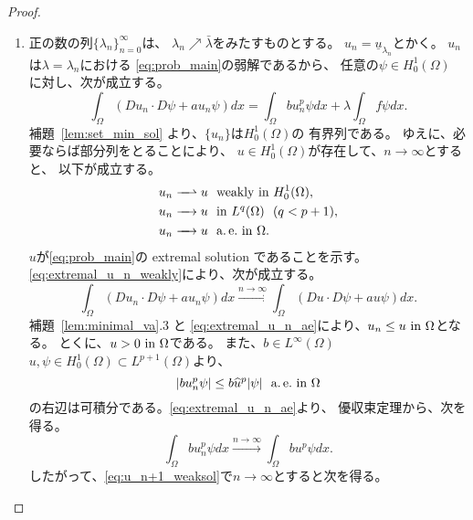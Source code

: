 \begin{proof}
 \begin{enumerate}[1.]
  \item 正の数の列$\{ \lambda_n \}_{n=0}^\infty$は、
        $\lambda_n \nearrow \bar{\lambda}$をみたすものとする。
        $u_n = \underline{u}_{\lambda_n}$とかく。
        $u_n$は$\lambda = \lambda_n$における
         \ref{eq:prob_main}の弱解であるから、
        任意の$\psi \in H_0^1(\Omega)$
        に対し、次が成立する。
        \begin{equation}
         \int_\Omega (Du_n \cdot D\psi + a u_{n} \psi) dx 
          = \int_\Omega bu_n^p \psi dx + \lambda \int_\Omega f\psi dx.
          \label{eq:u_n_weaksol}
        \end{equation}
        補題~\ref{lem:set_min_sol} より、$\{ u_n \}$は$H_0^1(\Omega)$の
         有界列である。
        ゆえに、必要ならば部分列をとることにより、
        $u \in H_0^1(\Omega)$が存在して、$n \to \infty$とすると、
        以下が成立する。
        \begin{align}
         u_n \xrightharpoonup{ \mbox{ ~ } } u & \ \ \text{weakly~} \tin
         H_0^1(\Omega), \label{eq:extremal_u_n_weakly} \\
         u_n \xrightarrow{ \mbox{ ~ } } u & \ \ \tin L^q(\Omega) \ \
          (q < p+1), \notag \\
         u_n \xrightarrow{ \mbox{ ~ } } u & \ \ \ae \tin \Omega. 
         \label{eq:extremal_u_n_ae}
        \end{align}
        $u$が\ref{eq:prob_main}の extremal solution であることを示す。
        \eqref{eq:extremal_u_n_weakly}により、次が成立する。
        \[
        \int_\Omega (Du_n \cdot D\psi + a u_n \psi) dx
        \xrightarrow{n \to \infty}
        \int_\Omega (Du \cdot D\psi + a u \psi) dx.
        \]
         補題~\ref{lem:minimal_va}.3 と
        \eqref{eq:extremal_u_n_ae}により、$u_n \leq u ~\text{in}~ \Omega$となる。
         とくに、$u > 0 ~\text{in}~ \Omega$である。
        また、$b \in L^\infty(\Omega)$
        $u, \psi \in H_0^1(\Omega) \subset L^{p+1}(\Omega)$より、
        \[
        \left\lvert bu_n^p \psi \right\rvert \leq b \widehat{u}^p
        \lvert\psi\rvert \ \ \text{a.\,e.}~
        \text{in}~ \Omega
        \]
         の右辺は可積分である。\eqref{eq:extremal_u_n_ae}より、
        優収束定理から、次を得る。
        \[
        \int_\Omega bu_n^p \psi dx \xrightarrow{n \to \infty} 
        \int_\Omega bu^p \psi dx.
        \]
        したがって、\eqref{eq:u_n+1_weaksol}で$n \to \infty$とすると次を得る。
        \begin{equation}

\end{equation}
\end{enumerate}
\end{proof}
